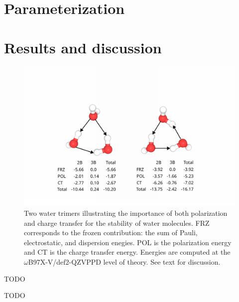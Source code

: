 \documentclass[journal=jacsat,manuscript=article]{achemso}
\begin{document}
\section*{Parameterization}


\section*{Results and discussion}



\begin{figure}
  \includegraphics*[width=\textwidth]{figures/trimer_mbe_example.png}
  \caption{Two water trimers illustrating the importance of both polarization
  and charge transfer for the stability of water molecules. FRZ corresponds to
  the frozen contribution: the sum of Pauli, electrostatic, and dispersion enegies. POL is the polarization
  energy and CT is the charge transfer energy. Energies are computed at the
  $\omega$B97X-V/def2-QZVPPD level of theory. See text for discussion.}
\end{figure}

\begin{acknowledgement}

TODO

\end{acknowledgement}

\begin{suppinfo}

TODO

\end{suppinfo}


\end{document}
